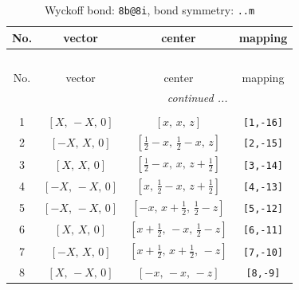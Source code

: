 \documentclass[fleqn,8pt]{jsarticle}
\begin{document}
\begin{longtable}{cccc}
\caption{Wyckoff bond: {\tt 8b@8i}, bond symmetry: {\tt ..m}}
 \\
 \hline \hline
No. & vector & center & mapping \\ \hline \endfirsthead

\multicolumn{3}{l}{\tablename\ \thetable{}} \\
 \hline \hline
No. & vector & center & mapping \\ \hline \endhead

 \hline \hline
\multicolumn{3}{r}{\footnotesize\it continued ...} \\ \endfoot

 \hline \hline
\multicolumn{3}{r}{} \\ \endlastfoot

1 & $\left[ X,\, - X,\, 0 \right]$ & $\left[ x,\, x,\, z \right]$ & {\tt [1,-16]} \\ \hline
2 & $\left[ - X,\, X,\, 0 \right]$ & $\left[ \frac{1}{2} - x,\, \frac{1}{2} - x,\, z \right]$ & {\tt [2,-15]} \\ \hline
3 & $\left[ X,\, X,\, 0 \right]$ & $\left[ \frac{1}{2} - x,\, x,\, z + \frac{1}{2} \right]$ & {\tt [3,-14]} \\ \hline
4 & $\left[ - X,\, - X,\, 0 \right]$ & $\left[ x,\, \frac{1}{2} - x,\, z + \frac{1}{2} \right]$ & {\tt [4,-13]} \\ \hline
5 & $\left[ - X,\, - X,\, 0 \right]$ & $\left[ - x,\, x + \frac{1}{2},\, \frac{1}{2} - z \right]$ & {\tt [5,-12]} \\ \hline
6 & $\left[ X,\, X,\, 0 \right]$ & $\left[ x + \frac{1}{2},\, - x,\, \frac{1}{2} - z \right]$ & {\tt [6,-11]} \\ \hline
7 & $\left[ - X,\, X,\, 0 \right]$ & $\left[ x + \frac{1}{2},\, x + \frac{1}{2},\, - z \right]$ & {\tt [7,-10]} \\ \hline
8 & $\left[ X,\, - X,\, 0 \right]$ & $\left[ - x,\, - x,\, - z \right]$ & {\tt [8,-9]} \\
\end{longtable}
\renewcommand{\arraystretch}{1.2}
\end{document}
